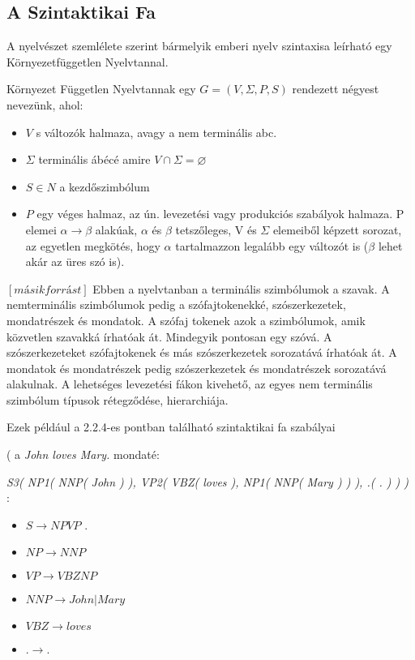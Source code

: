 \subsection{A Szintaktikai Fa}
A nyelvészet szemlélete szerint bármelyik emberi nyelv szintaxisa leírható egy Környezetfüggetlen Nyelvtannal.

Környezet Független Nyelvtannak egy $G=(V,\Sigma ,P,S)$ rendezett négyest nevezünk, ahol:

\begin{itemize}
	\item \emph{$V$} s változók halmaza, avagy a nem terminális abc.
	\item \emph{$\Sigma$} terminális ábécé amire $ V \cap \Sigma =\varnothing $
	\item \emph{$S \in N$} a kezdőszimbólum
	\item \emph{$P$} egy véges halmaz, az ún. levezetési vagy produkciós szabályok halmaza. P elemei
$\alpha \to \beta$ alakúak, $\alpha$ és $\beta$ tetszőleges, V és $\Sigma$ elemeiből képzett sorozat, az egyetlen
megkötés, hogy $\alpha$ tartalmazzon legalább egy változót is ($\beta$ lehet akár az üres szó is).
\end{itemize}
$[ másik forrást]$
Ebben a nyelvtanban a terminális szimbólumok a szavak. 
A nemterminális szimbólumok pedig a szófajtokenekké, szószerkezetek, mondatrészek és mondatok.
A szófaj tokenek azok a szimbólumok, amik közvetlen szavakká írhatóak át.
Mindegyik pontosan egy szóvá. 
A szószerkezeteket szófajtokenek és más szószerkezetek sorozatává írhatóak át.
A mondatok és mondatrészek pedig szószerkezetek és mondatrészek sorozatává alakulnak.
A lehetséges levezetési fákon kivehető, az egyes nem terminális szimbólum típusok rétegződése, hierarchiája.


Ezek például a 2.2.4-es pontban található szintaktikai fa szabályai

( a \textit{John loves Mary.} mondaté: 

\textit{S3( NP1( NNP( John ) ), VP2( VBZ( loves ),  NP1( NNP( Mary ) ) ), .( . ) ) )} :
\begin{itemize}
\item$S \to NP VP$ .
\item$NP \to NNP$
\item$VP \to VBZ NP$
\item$NNP \to John | Mary$
\item$VBZ \to loves$
\item$. \to .$
\end{itemize}

